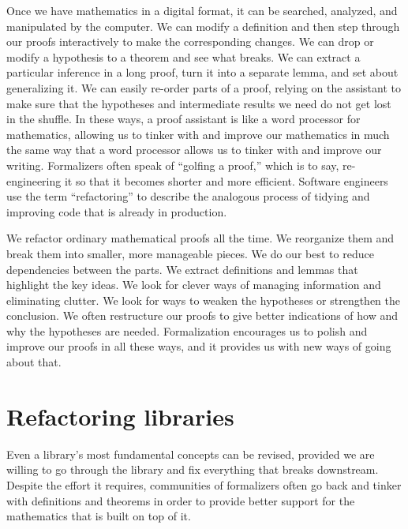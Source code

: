 \documentclass[12pt]{amsart}
\theoremstyle{definition}
\theoremstyle{remark}
\numberwithin{equation}{section}
\begin{document}
Once we have mathematics in a digital format, it can be searched, analyzed, and manipulated by the computer. We can modify a definition and then step through our proofs interactively to make the corresponding changes. We can drop or modify a hypothesis to a theorem and see what breaks. We can extract a particular inference in a long proof, turn it into a separate lemma, and set about generalizing it. We can easily re-order parts of a proof, relying on the assistant to make sure that the hypotheses and intermediate results we need do not get lost in the shuffle. In these ways, a proof assistant is like a word processor for mathematics, allowing us to tinker with and improve our mathematics in much the same way that a word processor allows us to tinker with and improve our writing. Formalizers often speak of ``golfing a proof,'' which is to say, re-engineering it so that it becomes shorter and more efficient. Software engineers use the term ``refactoring'' to describe the analogous process of tidying and improving code that is already in production.

We refactor ordinary mathematical proofs all the time. We reorganize them and break them into smaller, more manageable pieces. We do our best to reduce dependencies between the parts. We extract definitions and lemmas that highlight the key ideas. We look for clever ways of managing information and eliminating clutter. We look for ways to weaken the hypotheses or strengthen the conclusion. We often restructure our proofs to give better indications of how and why the hypotheses are needed. Formalization encourages us to polish and improve our proofs in all these ways, and it provides us with new ways of going about that.


\section{Refactoring libraries}

Even a library's most fundamental concepts can be revised, provided we are willing to go through the library and fix everything that breaks downstream. Despite the effort it requires, communities of formalizers often go back and tinker with definitions and theorems in order to provide better support for the mathematics that is built on top of it.
\end{document}
